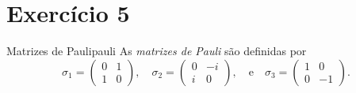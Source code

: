 \section*{Exercício 5}

\begin{definition}{Matrizes de Pauli}{pauli}
    As \emph{matrizes de Pauli} são definidas por
    \begin{equation*}
        \sigma_1 = \begin{pmatrix}
            0&1\\1&0
        \end{pmatrix},\quad\sigma_2 = \begin{pmatrix}
            0&-i\\i&0
        \end{pmatrix},\quad\text{e}\quad\sigma_3 = \begin{pmatrix}
            1&0\\0&-1
        \end{pmatrix}.
    \end{equation*}
\end{definition}

